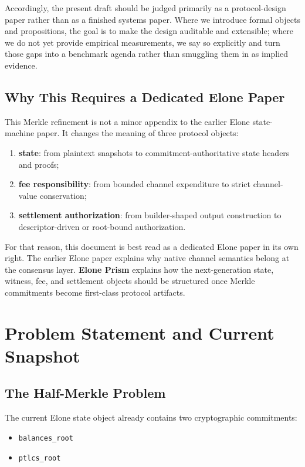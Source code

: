 \documentclass[11pt,a4paper]{article}
\newcommand{\code}[1]{\texttt{#1}}
\begin{document}
Accordingly, the present draft should be judged primarily as a protocol-design paper rather than as a finished systems paper. Where we introduce formal objects and propositions, the goal is to make the design auditable and extensible; where we do not yet provide empirical measurements, we say so explicitly and turn those gaps into a benchmark agenda rather than smuggling them in as implied evidence.

\subsection{Why This Requires a Dedicated Elone Paper}

This Merkle refinement is not a minor appendix to the earlier Elone state-machine paper. It changes the meaning of three protocol objects:
\begin{enumerate}
    \item \textbf{state}: from plaintext snapshots to commitment-authoritative state headers and proofs;
    \item \textbf{fee responsibility}: from bounded channel expenditure to strict channel-value conservation;
    \item \textbf{settlement authorization}: from builder-shaped output construction to descriptor-driven or root-bound authorization.
\end{enumerate}

For that reason, this document is best read as a dedicated Elone paper in its own right. The earlier Elone paper explains why native channel semantics belong at the consensus layer. \textbf{Elone Prism} explains how the next-generation state, witness, fee, and settlement objects should be structured once Merkle commitments become first-class protocol artifacts.

\section{Problem Statement and Current Snapshot}

\subsection{The Half-Merkle Problem}

The current Elone state object already contains two cryptographic commitments:
\begin{itemize}
    \item \code{balances\_root}
    \item \code{ptlcs\_root}
\end{itemize}
\end{document}
